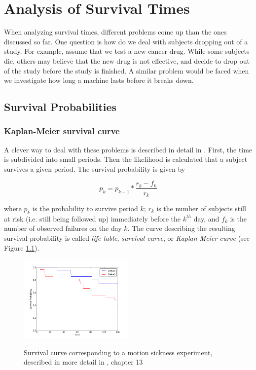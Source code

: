 \chapter{Analysis of Survival Times} 

When analyzing survival times, different problems come up than the ones discussed so far. One question is how do we deal with subjects dropping out of a study. For example, assume that we test a new cancer drug. While some subjects die, others may believe that the new drug is not effective, and decide to drop out of the study before the study is finished.
A similar problem would be faced when we investigate how long a machine lasts before it breaks down.

\section{Survival Probabilities}

\subsection{Kaplan-Meier survival curve} 

A clever way to deal with these problems is described in detail in \cite{altman99}. First, the time is subdivided into small periods. Then the likelihood is calculated that a subject survives a given period. The survival probability is given by

\begin{equation}
  p_k = p_{k-1} * \frac{r_k-f_k}{r_k}
\end{equation}

where $p_k$ is the probability to survive period $k$; $r_k$ is the number of subjects still at risk (i.e. still being followed up) immediately before the $k^{th}$ day, and $f_k$ is the number of observed failures on the day $k$. The curve describing the resulting survival probability is called \emph{life table}, \emph{survival curve}, or \emph{Kaplan-Meier curve} (see Figure \ref{fig:SurvivalCurve}).

\begin{figure}
  \centering
  \includegraphics[width=0.5\textwidth]{../Images/Survival.png}\\
  \caption{Survival curve corresponding to a motion sickness experiment, described in more detail in \cite{altman99}, chapter 13}\label{fig:SurvivalCurve}
\end{figure}

